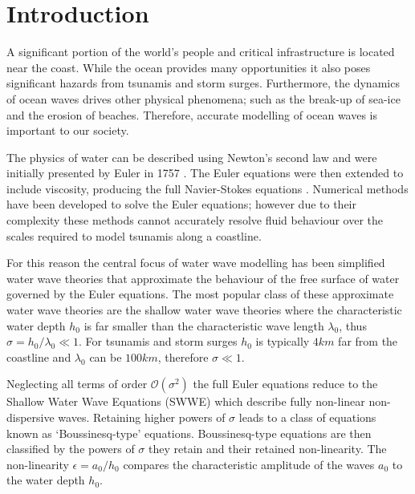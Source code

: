\chapter{Introduction}
\label{chp:Introduction}

A significant portion of the world's people and critical infrastructure is located near the coast. While the ocean provides many opportunities it also poses significant hazards from tsunamis and storm surges. Furthermore, the dynamics of ocean waves drives other physical phenomena; such as the break-up of sea-ice and the erosion of beaches. Therefore, accurate modelling of ocean waves is important to our society. 

The physics of water can be described using Newton's second law and were initially presented by Euler in 1757 \cite{Euler-1755-274}. The Euler equations were then extended to include viscosity, producing the full Navier-Stokes equations \cite{navier1823,stokes1845gg}. Numerical methods \cite{Chorin-1967-928,Taylor-Hood-1973-73,Bassi-1997-267} have been developed to solve the Euler equations; however due to their complexity these methods cannot accurately resolve fluid behaviour over the scales required to model tsunamis along a coastline. 

For this reason the central focus of water wave modelling has been simplified water wave theories that approximate the behaviour of the free surface of water governed by the Euler equations. The most popular class of these approximate water wave theories are the shallow water wave theories where the characteristic water depth $h_0$ is far smaller than the characteristic wave length $\lambda_0$, thus $\sigma = h_0 / \lambda_0 \ll 1$. For tsunamis and storm surges $h_0$ is typically $4km$ far from the coastline and $\lambda_0$ can be $100km$, therefore $\sigma\ll 1$.

Neglecting all terms of order $\mathcal{O}\left(\sigma ^2\right)$ the full Euler equations reduce to the Shallow Water Wave Equations (SWWE) \cite{Bonneton-Lannes-2009-16601} which describe fully non-linear non-dispersive waves. Retaining higher powers of $\sigma$ leads to a class of equations known as `Boussinesq-type' equations. Boussinesq-type equations are then classified by the powers of $\sigma$ they retain and their retained non-linearity. The non-linearity $\epsilon= a_0 / h_0$ compares the characteristic amplitude of the waves $a_0$ to the water depth $h_0$. 

